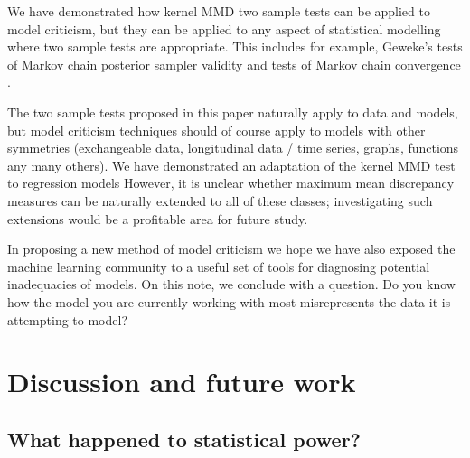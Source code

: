 We have demonstrated how kernel MMD two sample tests can be applied to model criticism, but they can be applied to any aspect of statistical modelling where two sample tests are appropriate.
This includes for example, Geweke's tests of Markov chain posterior sampler validity \citep{Geweke2004-yx} and tests of Markov chain convergence \citep[e.g.][]{Cowles1996-qy}.

The two sample tests proposed in this paper naturally apply to \iid data and models, but model criticism techniques should of course apply to models with other symmetries (\eg exchangeable data, longitudinal data / time series, graphs, functions any many others).
We have demonstrated an adaptation of the kernel MMD test to regression models
However, it is unclear whether maximum mean discrepancy measures can be naturally extended to all of these classes; investigating such extensions would be a profitable area for future study.

In proposing a new method of model criticism we hope we have also exposed the machine learning community to a useful set of tools for diagnosing potential inadequacies of models.
On this note, we conclude with a question.
Do you know how the model you are currently working with most misrepresents the data it is attempting to model?

\section{Discussion and future work}

\subsection{What happened to statistical power?}

